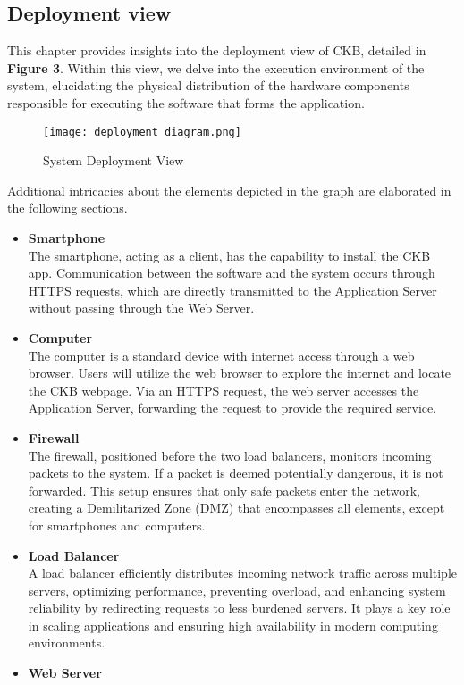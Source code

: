 \documentclass{article}
\begin{document}
\subsection{Deployment view}
This chapter provides insights into the deployment view of CKB, detailed in \textbf{Figure 3}. Within this view, we delve into the execution environment of the system, elucidating the physical distribution of the hardware components responsible for executing the software that forms the application.
\begin{figure}[H]
    \centering
    \texttt{[image: deployment diagram.png]}
    \caption{System Deployment View}
\end{figure}
\noindent
Additional intricacies about the elements depicted in the graph are elaborated in the following sections.
\begin{itemize}
    \item \textbf{Smartphone} \\
    The smartphone, acting as a client, has the capability to install the CKB app. Communication between the software and the system occurs through HTTPS requests, which are directly transmitted to the Application Server without passing through the Web Server.
    \item \textbf{Computer} \\
    The computer is a standard device with internet access through a web browser. Users will utilize the web browser to explore the internet and locate the CKB webpage. Via an HTTPS request, the web server accesses the Application Server, forwarding the request to provide the required service.
    \item \textbf{Firewall} \\
    The firewall, positioned before the two load balancers, monitors incoming packets to the system. If a packet is deemed potentially dangerous, it is not forwarded. This setup ensures that only safe packets enter the network, creating a Demilitarized Zone (DMZ) that encompasses all elements, except for smartphones and computers.
    \item \textbf{Load Balancer} \\
    A load balancer efficiently distributes incoming network traffic across multiple servers, optimizing performance, preventing overload, and enhancing system reliability by redirecting requests to less burdened servers. It plays a key role in scaling applications and ensuring high availability in modern computing environments.
    \item \textbf{Web Server} \\

\end{itemize}
\end{document}
